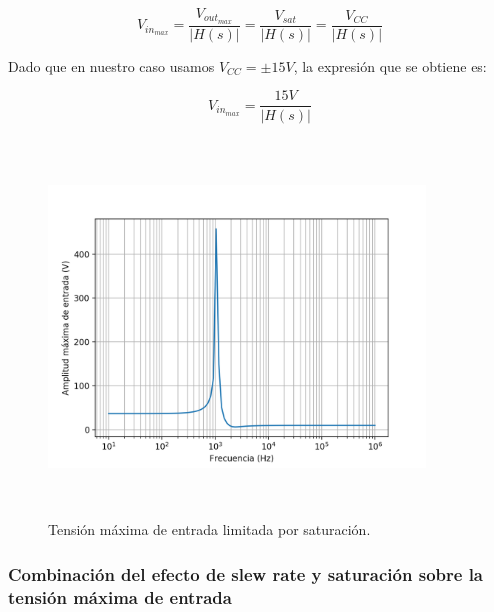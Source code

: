 \begin{equation}
V_{in_{max}} = \frac{V_{out_{max}}}{\rvert H(s) \rvert} = \frac{V_{sat}}{\rvert H(s) \rvert} = \frac{V_{CC}}{\rvert H(s) \rvert}
\end{equation}

Dado que en nuestro caso usamos $V_{CC} = \pm15V$, la expresi\'on que se obtiene es:

\begin{equation}
V_{in_{max}} = \frac{15V}{\rvert H(s) \rvert} 
\end{equation}


\begin{figure}[H] %
	\centering
	\includegraphics[width=10cm,height=10cm,keepaspectratio]{../EJ1/00GRAFICOS/vinmaxsat.png}
	\caption{Tensi\'on m\'axima de entrada limitada por saturaci\'on.}
	\label{vinmaxsat}
\end{figure}

\subsubsection*{Combinaci\'on del efecto de slew rate y saturaci\'on sobre la tensi\'on m\'axima de entrada}


